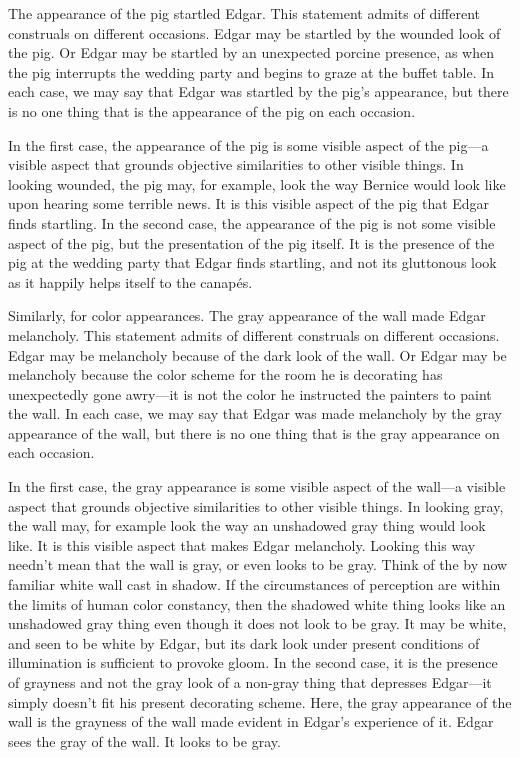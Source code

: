 \documentclass[12pt]{article}
\begin{document}
The appearance of the pig startled Edgar. This statement admits of different construals on different occasions. Edgar may be startled by the wounded look of the pig. Or Edgar may be startled by an unexpected porcine presence, as when the pig interrupts the wedding party and begins to graze at the buffet table. In each case, we may say that Edgar was startled by the pig's appearance, but there is no one thing that is the appearance of the pig on each occasion. 

In the first case, the appearance of the pig is some visible aspect of the pig---a visible aspect that grounds objective similarities to other visible things. In looking wounded, the pig may, for example, look the way Bernice would look like upon hearing some terrible news. It is this visible aspect of the pig that Edgar finds startling. In the second case, the appearance of the pig is not some visible aspect of the pig, but the presentation of the pig itself. It is the presence of the pig at the wedding party that Edgar finds startling, and not its gluttonous look as it happily helps itself to the canapés.

Similarly, for color appearances. The gray appearance of the wall made Edgar melancholy. This statement admits of different construals on different occasions. Edgar may be melancholy because of the dark look of the wall. Or Edgar may be melancholy because the color scheme for the room he is decorating has unexpectedly gone awry---it is not the color he instructed the painters to paint the wall. In each case, we may say that Edgar was made melancholy by the gray appearance of the wall, but there is no one thing that is the gray appearance on each occasion.

In the first case, the gray appearance is some visible aspect of the wall---a visible aspect that grounds objective similarities to other visible things. In looking gray, the wall may, for example look the way an unshadowed gray thing would look like. It is this visible aspect that makes Edgar melancholy. Looking this way needn't mean that the wall is gray, or even looks to be gray. Think of the by now familiar white wall cast in shadow. If the circumstances of perception are within the limits of human color constancy, then the shadowed white thing looks like an unshadowed gray thing even though it does not look to be gray. It may be white, and seen to be white by Edgar, but its dark look under present conditions of illumination is sufficient to provoke gloom. In the second case, it is the presence of grayness and not the gray look of a non-gray thing that depresses Edgar---it simply doesn't fit his present decorating scheme. Here, the gray appearance of the wall is the grayness of the wall made evident in Edgar's experience of it. Edgar sees the gray of the wall. It looks to be gray.
\end{document}
